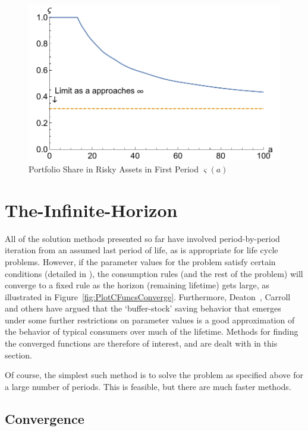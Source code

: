 \documentclass[titlepage]{\econtex}
\begin{document}
\hypertarget{PlotRiskySharetOfat}{}
\begin{figure}
        \includegraphics{./Figures/PlotRiskySharetOfat}
        \caption{Portfolio Share in Risky Assets in First Period $\varsigma({a})$}
        \label{fig:PlotRiskySharetOfat}
\end{figure}

\hypertarget{The-Infinite-Horizon}{}
\section{The-Infinite-Horizon}

All of the solution methods presented so far have involved
period-by-period iteration from an assumed last period of life, as is
appropriate for life cycle problems.  However, if the parameter values
for the problem satisfy certain conditions (detailed in
\cite{BufferStockTheory}), the consumption rules (and the rest of
the problem) will converge to a fixed rule as the horizon (remaining
lifetime) gets large, as illustrated in
Figure~\ref{fig:PlotCFuncsConverge}.  Furthermore,
Deaton~\citeyearpar{deatonLiqConstr},
Carroll~\citeyearpar{carroll:brookings,carrollBSLCPIH} and others
have argued that the `buffer-stock' saving behavior that emerges under
some further restrictions on parameter values is a good approximation
of the behavior of typical consumers over much of the lifetime.
Methods for finding the converged functions are therefore of interest,
and are dealt with in this section.

Of course, the simplest such method is to solve the problem as
specified above for a large number of periods.  This is feasible, but
there are much faster methods.

\subsection{Convergence}
\end{document}
